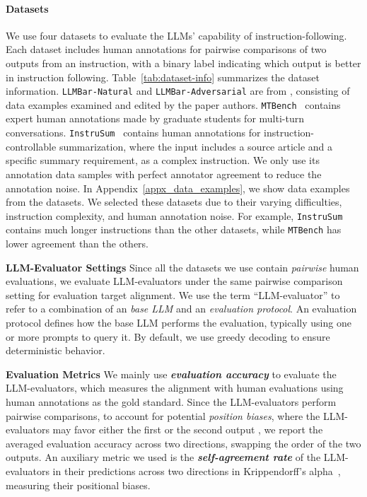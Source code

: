 \documentclass[11pt]{article}
\newcommand{\llmbarnatural}{\texttt{LLMBar-Natural}\xspace}
\newcommand{\adversarial}{\texttt{LLMBar-Adversarial}\xspace}
\newcommand{\mtbench}{\texttt{MTBench}\xspace}
\newcommand{\instrusum}{\texttt{InstruSum}\xspace}
\newcommand{\cparagraph}[1]{\noindent\textbf{#1}}
\begin{document}
\paragraph{Datasets}
We use four datasets to evaluate the LLMs' capability of instruction-following.
Each dataset includes human annotations for pairwise comparisons of two outputs from an instruction, with a binary label indicating which output is better in instruction following.
Table~\ref{tab:dataset-info} summarizes the dataset information.
\llmbarnatural and \adversarial are from \citet{zeng2024evaluating}, consisting of data examples examined and edited by the paper authors.
\mtbench~\citep{zheng2024judging} contains expert human annotations made by graduate students for multi-turn conversations. 
\instrusum~\cite{liu2024benchmarking} contains human annotations for instruction-controllable summarization, where the input includes a source article and a specific summary requirement, as a complex instruction.
We only use its annotation data samples with perfect annotator agreement to reduce the annotation noise.
In Appendix~\ref{appx_data_examples}, we show data examples from the datasets.
We selected these datasets due to their varying difficulties, instruction complexity, and human annotation noise.
For example, \instrusum contains much longer instructions than the other datasets, while \mtbench has lower agreement than the others.



% 
\cparagraph{LLM-Evaluator Settings}
Since all the datasets we use contain \textit{pairwise} human evaluations, we evaluate LLM-evaluators under the same pairwise comparison setting for evaluation target alignment.
We use the term ``LLM-evaluator'' to refer to a combination of an \textit{base LLM} and an \textit{evaluation protocol}.
An evaluation protocol defines how the base LLM performs the evaluation, typically using one or more prompts to query it.
By default, we use greedy decoding to ensure deterministic behavior.



% 
\cparagraph{Evaluation Metrics}
We mainly use \textit{\textbf{evaluation accuracy}} to evaluate the LLM-evaluators, which measures the alignment with human evaluations using human annotations as the gold standard.
Since the LLM-evaluators perform pairwise comparisons, to account for potential \textit{position biases}, where the LLM-evaluators may favor either the first or the second output \cite{wang-etal-2024-large-language-models-fair}, we report the averaged evaluation accuracy across two directions, swapping the order of the two outputs.
An auxiliary metric we used is the \textit{\textbf{self-agreement rate}} of the LLM-evaluators in their predictions across two directions in Krippendorff’s alpha~\cite{Krippendorff2011ComputingKA}, measuring their positional biases.
% 
\end{document}
